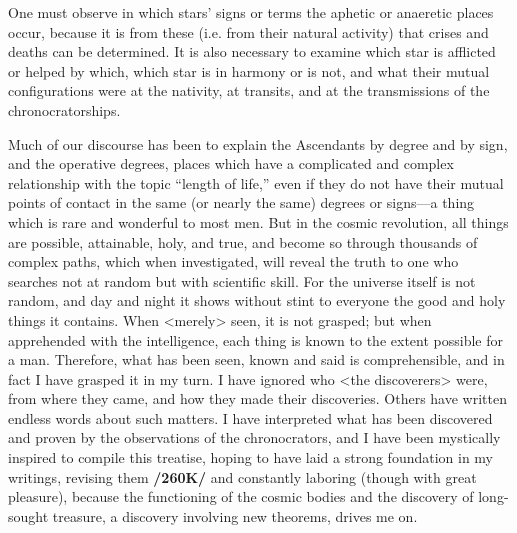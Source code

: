 One \mndl must observe in which stars’ signs or terms the aphetic or anaeretic places occur, because it is from these (i.e. from their natural activity) that crises and deaths can be determined. It is also necessary to examine which star is afflicted or helped by which, which star is in harmony or is not, and what their mutual configurations were at the nativity, at transits, and at the transmissions of the chronocratorships.

Much of our discourse has been to explain the Ascendants by degree and by sign, and the operative degrees, places which have a complicated and complex relationship with the topic “length of life,” even if they do not have their mutual points of contact in the same (or nearly the same) degrees or signs—a thing which is rare and wonderful to most men. But in the cosmic revolution, all things are possible, attainable, holy, and true, and become so through thousands of complex paths, which when investigated, will reveal the truth to one who searches not at random but with scientific skill. For the universe itself is not random, and day and night it shows without stint to everyone the good and holy things it contains. When <merely> seen, it is not grasped; but when apprehended with the intelligence, each thing is known to the extent possible for a man. Therefore, what has been seen, known and said is comprehensible, and in fact I have grasped it in my turn. I have ignored who <the discoverers> were, from where they came, and how they made their discoveries. Others have written endless words about such matters. I have interpreted
what has been discovered and proven by the observations of the chronocrators, and I have been mystically inspired to compile this treatise, hoping to have laid a strong foundation in my writings, revising them \textbf{/260K/} and constantly laboring (though with great pleasure), because the functioning of the cosmic bodies and the discovery of long-sought treasure, a discovery involving new theorems, drives me on.

\newpage